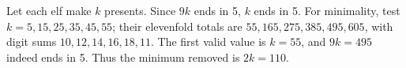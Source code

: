 Let each elf make $k$ presents. Since $9k$ ends in 5, $k$ ends in 5. For minimality, test $k=5,15,25,35,45,55$; their elevenfold totals are $55,165,275,385,495,605$, with digit sums $10,12,14,16,18,11$. The first valid value is $k=55$, and $9k=495$ indeed ends in 5. Thus the minimum removed is $2k=\boxed{110}$.
